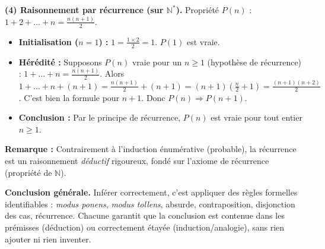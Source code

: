 \documentclass[11pt]{article}
\begin{document}
\begin{exoresolu}
\textbf{(4) Raisonnement par récurrence (sur $\mathbb{N}^*$).}
Propriété $P(n)$ : $1 + 2 + \dots + n = \frac{n(n+1)}{2}$.
\begin{itemize}
\item \textbf{Initialisation ($n=1$) :} $1 = \frac{1 \times 2}{2} = 1$. $P(1)$ est vraie.
\item \textbf{Hérédité :} Supposons $P(n)$ vraie pour un $n \ge 1$ (hypothèse de récurrence) : $1 + \dots + n = \frac{n(n+1)}{2}$.
      Alors $1 + \dots + n + (n+1) = \frac{n(n+1)}{2} + (n+1) = (n+1)(\frac{n}{2} + 1) = \frac{(n+1)(n+2)}{2}$.
      C'est bien la formule pour $n+1$. Donc $P(n) \Rightarrow P(n+1)$.
\item \textbf{Conclusion :} Par le principe de récurrence, $P(n)$ est vraie pour tout entier $n \ge 1$.
\end{itemize}
\textbf{Remarque :} Contrairement à l'induction énumérative (probable), la récurrence est un raisonnement \emph{déductif} rigoureux, fondé sur l'axiome de récurrence (propriété de $\mathbb{N}$).

\textbf{Conclusion générale.} Inférer correctement, c'est appliquer des règles formelles identifiables : \textit{modus ponens}, \textit{modus tollens}, absurde, contraposition, disjonction des cas, récurrence. Chacune garantit que la conclusion est contenue dans les prémisses (déduction) ou correctement étayée (induction/analogie), sans rien ajouter ni rien inventer.
\end{exoresolu}
\end{document}

